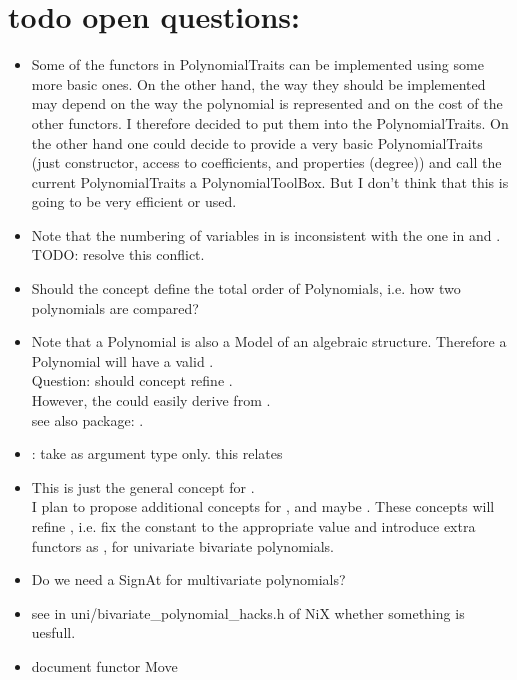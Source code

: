 \section{todo open questions:}

\begin{itemize} 
\item Some of the functors in PolynomialTraits can be implemented using some more basic ones. 
      On the other hand, the way they should be implemented may depend on  the way the polynomial is 
      represented and on the cost of the other functors. 
      I therefore decided to put them into the PolynomialTraits. 
      On the other hand one could decide to provide a very basic PolynomialTraits 
      (just constructor, access to coefficients, and properties (degree)) and call the current 
      PolynomialTraits a PolynomialToolBox. But I don't think that this is going to be very efficient 
      or used. 

\item Note that the numbering of variables in  is inconsistent
      with the one in  and . \\
      TODO: resolve this conflict. 

\item Should the concept define the total order of Polynomials, i.e. how two polynomials are compared? 

\item Note that a Polynomial is also a Model of an algebraic structure. Therefore a Polynomial will have a
       valid . \\
      Question: should concept  refine .\\
      However, the  could easily derive from .\\
      see also package: . 

\item {}: take  as argument type only.
      this relates  

\item This is just the general concept for .  \\
      I plan to propose additional concepts for , and maybe .     
      These concepts will refine , i.e. fix the constant  to the appropriate value 
      and introduce extra functors as , for univariate bivariate polynomials. 

\item Do we need a SignAt for multivariate polynomials?
\item see in uni/bivariate\_polynomial\_hacks.h of NiX whether something is uesfull.
\item document functor Move 
\end{itemize}
